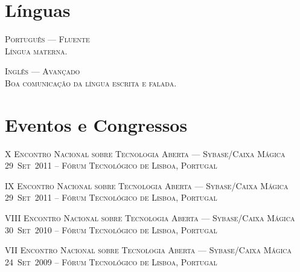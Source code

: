 \documentclass[a4paper,fontsize=10pt]{scrartcl} %
\begin{document}
\begin{minipage}[t]{0.46\textwidth}
\section{Línguas}
\textsc{Português --- Fluente}\\
\small\textsc{Língua materna.}
\\\par
\textsc{Inglês --- Avançado}\\
\small\textsc{Boa comunicação da língua escrita e falada.}
\\\par
\section{Eventos e Congressos}
\textsc{X Encontro Nacional sobre Tecnologia Aberta --- Sybase/Caixa Mágica}\\
\small\textsc{29~Set~2011 -- Fórum Tecnológico de Lisboa, Portugal}\\ \normalsize
\par
\textsc{IX Encontro Nacional sobre Tecnologia Aberta --- Sybase/Caixa Mágica}\\
\small\textsc{29~Set~2011 -- Fórum Tecnológico de Lisboa, Portugal}\\ \normalsize
\par
\textsc{VIII Encontro Nacional sobre Tecnologia Aberta --- Sybase/Caixa Mágica}\\
\small\textsc{30~Set~2010 -- Fórum Tecnológico de Lisboa, Portugal}\\ \normalsize
\par
\textsc{VII Encontro Nacional sobre Tecnologia Aberta --- Sybase/Caixa Mágica}\\
\small\textsc{24~Set~2009 -- Fórum Tecnológico de Lisboa, Portugal}\\ \normalsize

\end{minipage}
\end{document}
